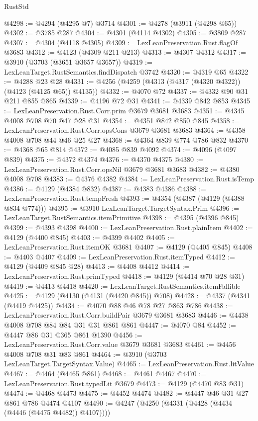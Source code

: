 \begin{lexlean}{RustStd}
\begin{coremodule}
@4298 := @4294 (@4295 @7) @3714
@4301 := @4278 (@3911 (@4298 @65))
@4302 := @3785 @287
@4304 := @4301 (@4114 @4302)
@4305 := @3809 @287
@4307 := @4304 (@4118 @4305)
@4309 := LexLeanPreservation.Rust.flagOf @3683
@4312 := @4123 (@4309 @211 @213)
@4313 := @4307 @4312
@4317 := @3910 (@3703 (@3651 @3657 @3657))
@4319 := LexLeanTarget.RustSemantics.findDispatch @3742
@4320 := @4319 @65
@4322 := @4288 @23 @28
@4331 := @4256 (@4259 (@4313 (@4317 (@4320 @4322)) (@4123 (@4125 @65)) @4135))
@4332 := @4070 @72
@4337 := @4332 @90 @31 @211 @855 @865
@4339 := @4196 @72 @31
@4341 := @4339 @842 @853
@4345 := LexLeanPreservation.Rust.Corr.prim @3679 @3681 @3683
@4351 := @4345 @4008 @708 @70 @47 @28 @31
@4354 := @4351 @842 @850 @845
@4358 := LexLeanPreservation.Rust.Corr.opsCons @3679 @3681 @3683
@4364 := @4358 @4008 @708 @44 @46 @25 @27
@4368 := @4364 @839 @774 @786 @832
@4370 := @4368 @65 @814
@4372 := @4085 @839 @4092
@4374 := @4096 (@4097 @839)
@4375 := @4372 @4374
@4376 := @4370 @4375
@4380 := LexLeanPreservation.Rust.Corr.opsNil @3679 @3681 @3683
@4382 := @4380 @4008 @708
@4383 := @4376 @4382
@4384 := LexLeanPreservation.Rust.isTemp
@4386 := @4129 (@4384 @832)
@4387 := @4383 @4386
@4388 := LexLeanPreservation.Rust.tempFresh
@4393 := @4354 (@4387 (@4129 (@4388 @834 @774)))
@4395 := @3910 LexLeanTarget.TargetSyntax.Prim
@4396 := LexLeanTarget.RustSemantics.itemPrimitive
@4398 := @4395 (@4396 @845)
@4399 := @4393 @4398
@4400 := LexLeanPreservation.Rust.plainItem
@4402 := @4129 (@4400 @845)
@4403 := @4399 @4402
@4405 := LexLeanPreservation.Rust.itemOK @3681
@4407 := @4129 (@4405 @845)
@4408 := @4403 @4407
@4409 := LexLeanPreservation.Rust.itemTyped
@4412 := @4129 (@4409 @845 @28)
@4413 := @4408 @4412
@4414 := LexLeanPreservation.Rust.primTyped
@4418 := @4129 (@4414 @70 @28 @31)
@4419 := @4413 @4418
@4420 := LexLeanTarget.RustSemantics.itemFallible
@4425 := @4129 (@4130 (@4131 (@4420 @845)) @708)
@4428 := @4337 (@4341 (@4419 @4425))
@4434 := @4070 @88 @46 @78 @27 @863 @786
@4438 := LexLeanPreservation.Rust.Corr.buildPair @3679 @3681 @3683
@4446 := @4438 @4008 @708 @84 @84 @31 @31 @861 @861
@4447 := @4070 @84
@4452 := @4447 @86 @31 @365 @861 @1390
@4456 := LexLeanPreservation.Rust.Corr.value @3679 @3681 @3683
@4461 := @4456 @4008 @708 @31 @83 @861
@4464 := @3910 (@3703 LexLeanTarget.TargetSyntax.Value)
@4465 := LexLeanPreservation.Rust.litValue
@4467 := @4464 (@4465 @861)
@4468 := @4461 @4467
@4470 := LexLeanPreservation.Rust.typedLit @3679
@4473 := @4129 (@4470 @83 @31)
@4474 := @4468 @4473
@4475 := @4452 @4474
@4482 := @4447 @46 @31 @27 @861 @786 @4474 @4107
@4490 := @4247 (@4250 (@4331 (@4428 (@4434 (@4446 (@4475 @4482)) @4107))))

\end{coremodule}
\end{lexlean}
